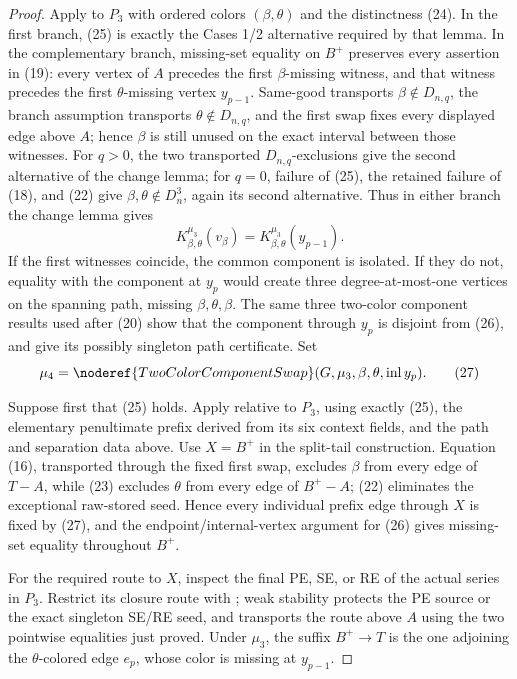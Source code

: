 \begin{proof}
Apply  to \(P_3\) with ordered colors
\((\beta,\theta)\) and the distinctness (24).  In the first branch,
(25) is exactly the Cases 1/2 alternative required by that lemma.
In the complementary branch, missing-set equality on \(B^+\) preserves
every assertion in (19): every vertex of \(A\)
precedes the first \(\beta\)-missing witness, and that witness precedes
the first \(\theta\)-missing vertex \(y_{p-1}\).  Same-good transports
\(\beta\notin D_{n,q}\), the branch assumption transports
\(\theta\notin D_{n,q}\), and the first swap fixes every displayed edge
above \(A\); hence \(\beta\) is still unused on the exact interval
between those witnesses.  For \(q>0\), the two transported
\(D_{n,q}\)-exclusions give the second alternative of the change lemma;
for \(q=0\), failure of (25), the retained failure of (18), and (22)
give \(\beta,\theta\notin D_n^3\), again its second alternative.  Thus
in either branch the change lemma gives
\[
 K^{\mu_3}_{\beta,\theta}(v_\beta)
      =K^{\mu_3}_{\beta,\theta}(y_{p-1}).                    \tag{26}
\]
If the first witnesses coincide, the common component is isolated.  If
they do not, equality with the component at \(y_p\) would create three
degree-at-most-one vertices on the spanning path, missing
\(\beta,\theta,\beta\).  The same three two-color component results used
after (20) show that the component through \(y_p\) is disjoint from
(26), and give its possibly singleton path certificate.  Set
\[
 \mu_4=\noderef{TwoColorComponentSwap}
       (G,\mu_3,\beta,\theta,\operatorname{inl}y_p).         \tag{27}
\]

Suppose first that (25) holds.  Apply
 relative to \(P_3\), using exactly
(25), the elementary penultimate prefix derived from its six context
fields, and the path and separation data above.  Use \(X=B^+\) in the
split-tail construction.  Equation (16), transported through the fixed
first swap, excludes \(\beta\) from every edge of \(T-A\), while (23)
excludes \(\theta\) from every edge of \(B^+-A\); (22) eliminates the
exceptional raw-stored seed.  Hence every individual prefix edge through
\(X\) is fixed by (27), and the endpoint/internal-vertex argument for
(26) gives missing-set equality throughout \(B^+\).

For the required route to \(X\), inspect the final PE, SE, or RE
 of the actual series in \(P_3\).
Restrict its closure route with
; weak stability protects
the PE source or the exact singleton SE/RE seed, and
 transports the
route above \(A\) using the two pointwise equalities just proved.  Under
\(\mu_3\), the suffix \(B^+\to T\) is the one
 adjoining the
\(\theta\)-colored edge \(e_p\), whose color is missing at
\(y_{p-1}\).


\end{proof}
